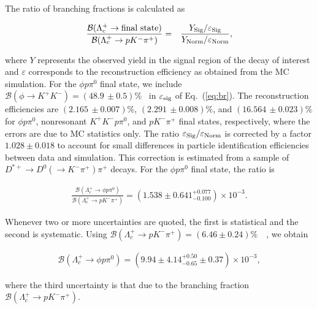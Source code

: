 \documentclass[aps,prl,twocolumn,superscriptaddress,showpacs,preprintnumbers,amsmath,amssymb]{revtex4-1}
\begin{document}
The ratio of branching fractions is calculated as
\begin{linenomath}
\begin{eqnarray}
\frac{\mathcal{B}(\Lambda_c^+\to {\rm final~state})}{\mathcal{B}(\Lambda_c^+\to pK^-\pi^+)} &=& \frac{Y_{\rm Sig}/\varepsilon_{\rm Sig}}{Y_{\rm Norm}/\varepsilon_{\rm Norm}} ,\label{eq:br}
\end{eqnarray}
\end{linenomath}
where $Y$ represents the observed yield in the signal region of the decay of interest and $\varepsilon$ corresponds to the reconstruction efficiency as obtained from the MC simulation. For the $\phi p\pi^0$ final state, we include  $\mathcal{B}(\phi\to K^+K^-)=(48.9\,\pm0.5)\%$~\cite{PDG} in $\varepsilon_{\rm sig}$ of Eq.~(\ref{eq:br}).
The reconstruction efficiencies are $(2.165\,\pm 0.007)\%$, $(2.291\,\pm0.008)\%$, and $(16.564\,\pm0.023)\%$  for $\phi p\pi^0$, nonresonant $K^+K^-p\pi^0$, and  $p K^-\pi^+$ final states, respectively, where the errors are due to MC statistics only.  The ratio $\varepsilon_{\rm Sig}/\varepsilon_{\rm Norm}$  is corrected by a factor $1.028 \pm 0.018$ to  account for   small differences in particle identification efficiencies between data and simulation.  This correction is estimated from a sample of $D^{*+}\to D^0(\to K^-\pi^+)\pi^+$ decays. 
For the $\phi p\pi^0$ final state, the ratio  is 
\begin{linenomath}
\begin{eqnarray}
\frac{\mathcal{B}(\Lambda_c^+\to\phi p\pi^0)}{\mathcal{B}(\Lambda_c^+\to pK^-\pi^+)}=(1.538\pm0.641^{+0.077}_{-0.100})\times10^{-3}.\nonumber 
\end{eqnarray}
\end{linenomath}
Whenever two or more uncertainties are quoted, the first is  statistical and the second is systematic.
Using  $\mathcal{B}(\Lambda_c^+\to pK^-\pi^+)=(6.46\pm0.24)\%$~~\cite{Amhis:2016xyh}, we obtain
\begin{linenomath}
\begin{eqnarray}
\mathcal{B}(\Lambda_c^+\to\phi p\pi^0)=(9.94\pm4.14^{+0.50}_{-0.65}\pm0.37)\times10^{-3},\nonumber 
\end{eqnarray}
\end{linenomath}
where the third uncertainty is that due to the branching fraction $\mathcal{B}(\Lambda_c^+\to p K^-\pi^+)$. 
\end{document}
